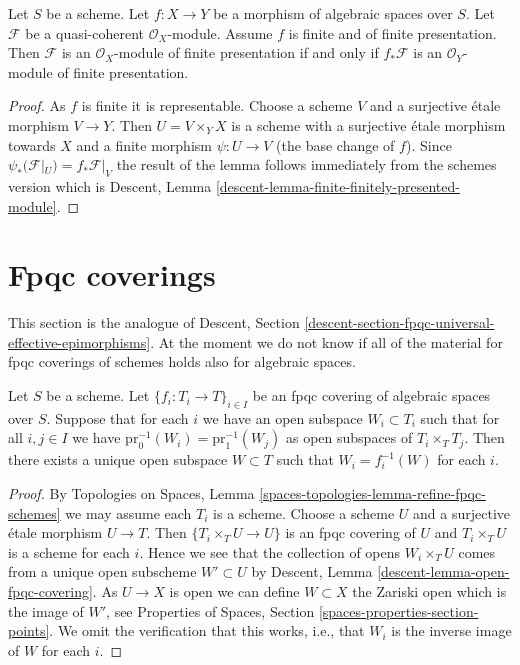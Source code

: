 \begin{lemma}
\label{lemma-finite-finitely-presented-module}
Let $S$ be a scheme.
Let $f : X \to Y$ be a morphism of algebraic spaces over $S$.
Let $\mathcal{F}$ be a quasi-coherent $\mathcal{O}_X$-module.
Assume $f$ is finite and of finite presentation.
Then $\mathcal{F}$ is an $\mathcal{O}_X$-module of finite presentation
if and only if $f_*\mathcal{F}$ is an $\mathcal{O}_Y$-module of finite
presentation.
\end{lemma}

\begin{proof}
As $f$ is finite it is representable. Choose a scheme $V$ and a surjective
\'etale morphism $V \to Y$. Then $U = V \times_Y X$ is a scheme with
a surjective \'etale morphism towards $X$ and a finite morphism
$\psi : U \to V$ (the base change of $f$). Since
$\psi_*(\mathcal{F}|_U) = f_*\mathcal{F}|_V$
the result of the lemma follows immediately from the schemes version which
is
Descent, Lemma \ref{descent-lemma-finite-finitely-presented-module}.
\end{proof}






\section{Fpqc coverings}
\label{section-fpqc}

\noindent
This section is the analogue of
Descent, Section \ref{descent-section-fpqc-universal-effective-epimorphisms}.
At the moment we do not know if all of the material for
fpqc coverings of schemes holds also for algebraic spaces.

\begin{lemma}
\label{lemma-open-fpqc-covering}
Let $S$ be a scheme.
Let $\{f_i : T_i \to T\}_{i \in I}$ be an fpqc covering
of algebraic spaces over $S$.
Suppose that for each $i$ we have an open subspace $W_i \subset T_i$
such that for all $i, j \in I$ we have
$\text{pr}_0^{-1}(W_i) = \text{pr}_1^{-1}(W_j)$ as open
subspaces of $T_i \times_T T_j$. Then there exists a unique open subspace
$W \subset T$ such that $W_i = f_i^{-1}(W)$ for each $i$.
\end{lemma}

\begin{proof}
By
Topologies on Spaces, Lemma \ref{spaces-topologies-lemma-refine-fpqc-schemes}
we may assume each $T_i$ is a scheme.
Choose a scheme $U$ and a surjective \'etale morphism $U \to T$.
Then $\{T_i \times_T U \to U\}$ is an fpqc covering of $U$
and $T_i \times_T U$ is a scheme for each $i$. Hence we
see that the collection of opens $W_i \times_T U$ comes from a unique
open subscheme $W' \subset U$ by
Descent, Lemma \ref{descent-lemma-open-fpqc-covering}.
As $U \to X$ is open we can define $W \subset X$ the Zariski
open which is the image of $W'$, see
Properties of Spaces, Section \ref{spaces-properties-section-points}.
We omit the verification that this works, i.e., that
$W_i$ is the inverse image of $W$ for each $i$.
\end{proof}

